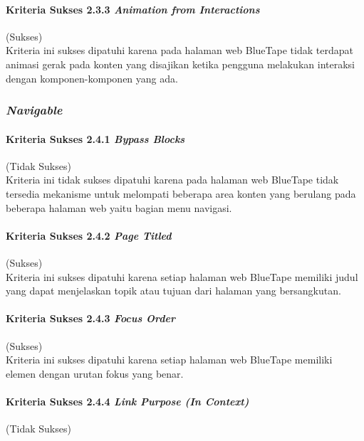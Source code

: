 \paragraph{Kriteria Sukses 2.3.3 \textit{Animation from Interactions}}
\label{par:kepatuhan_bluetape_kriteria_sukses_2.3.3}
(Sukses)\\

Kriteria ini sukses dipatuhi karena pada halaman web BlueTape tidak terdapat animasi gerak pada konten yang disajikan ketika pengguna melakukan interaksi dengan komponen-komponen yang ada.

\subsubsection{\textit{Navigable}}
\label{subsubsec:kepatuhan_bluetape_navigable}

\paragraph{Kriteria Sukses 2.4.1 \textit{Bypass Blocks}}
\label{par:kepatuhan_bluetape_kriteria_sukses_2.4.1}
(Tidak Sukses)\\

Kriteria ini tidak sukses dipatuhi karena pada halaman web BlueTape tidak tersedia mekanisme untuk melompati beberapa area konten yang berulang pada beberapa halaman web yaitu bagian menu navigasi.

\paragraph{Kriteria Sukses 2.4.2 \textit{Page Titled}}
\label{par:kepatuhan_bluetape_kriteria_sukses_2.4.2}
(Sukses)\\

Kriteria ini sukses dipatuhi karena setiap halaman web BlueTape memiliki judul yang dapat menjelaskan topik atau tujuan dari halaman yang bersangkutan.

\paragraph{Kriteria Sukses 2.4.3 \textit{Focus Order}}
\label{par:kepatuhan_bluetape_kriteria_sukses_2.4.3}
(Sukses)\\

Kriteria ini sukses dipatuhi karena setiap halaman web BlueTape memiliki elemen dengan urutan fokus yang benar. 

\paragraph{Kriteria Sukses 2.4.4 \textit{Link Purpose (In Context)}}
\label{par:kepatuhan_bluetape_kriteria_sukses_2.4.4}
(Tidak Sukses)\\

